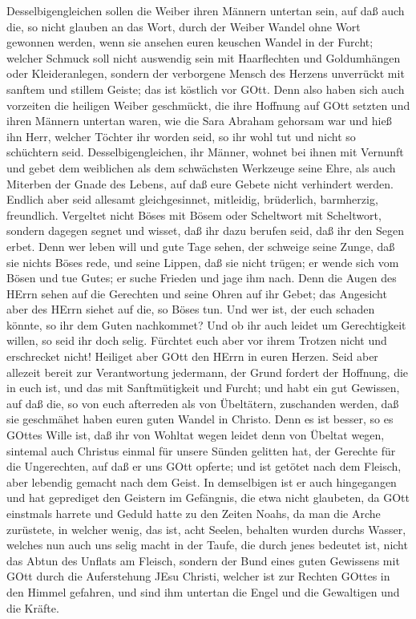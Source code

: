  Desselbigengleichen sollen die Weiber ihren Männern
untertan sein, auf daß auch die, so nicht glauben an das Wort, durch der
Weiber Wandel ohne Wort gewonnen werden,  wenn sie ansehen
euren keuschen Wandel in der Furcht;  welcher Schmuck soll
nicht auswendig sein mit Haarflechten und Goldumhängen oder
Kleideranlegen,  sondern der verborgene Mensch des Herzens
unverrückt mit sanftem und stillem Geiste; das ist köstlich vor GOtt.
 Denn also haben sich auch vorzeiten die heiligen Weiber
geschmückt, die ihre Hoffnung auf GOtt setzten und ihren Männern
untertan waren,  wie die Sara Abraham gehorsam war und hieß
ihn Herr, welcher Töchter ihr worden seid, so ihr wohl tut und nicht so
schüchtern seid.  Desselbigengleichen, ihr Männer, wohnet
bei ihnen mit Vernunft und gebet dem weiblichen als dem schwächsten
Werkzeuge seine Ehre, als auch Miterben der Gnade des Lebens, auf daß
eure Gebete nicht verhindert werden.  Endlich aber seid
allesamt gleichgesinnet, mitleidig, brüderlich, barmherzig, freundlich.
 Vergeltet nicht Böses mit Bösem oder Scheltwort mit
Scheltwort, sondern dagegen segnet und wisset, daß ihr dazu berufen
seid, daß ihr den Segen erbet.  Denn wer leben will und
gute Tage sehen, der schweige seine Zunge, daß sie nichts Böses rede,
und seine Lippen, daß sie nicht trügen;  er wende sich vom
Bösen und tue Gutes; er suche Frieden und jage ihm nach. 
Denn die Augen des HErrn sehen auf die Gerechten und seine Ohren auf ihr
Gebet; das Angesicht aber des HErrn siehet auf die, so Böses tun.
 Und wer ist, der euch schaden könnte, so ihr dem Guten
nachkommet?  Und ob ihr auch leidet um Gerechtigkeit
willen, so seid ihr doch selig. Fürchtet euch aber vor ihrem Trotzen
nicht und erschrecket nicht!  Heiliget aber GOtt den HErrn
in euren Herzen. Seid aber allezeit bereit zur Verantwortung jedermann,
der Grund fordert der Hoffnung, die in euch ist,  und das
mit Sanftmütigkeit und Furcht; und habt ein gut Gewissen, auf daß die,
so von euch afterreden als von Übeltätern, zuschanden werden, daß sie
geschmähet haben euren guten Wandel in Christo.  Denn es
ist besser, so es GOttes Wille ist, daß ihr von Wohltat wegen leidet
denn von Übeltat wegen,  sintemal auch Christus einmal für
unsere Sünden gelitten hat, der Gerechte für die Ungerechten, auf daß er
uns GOtt opferte; und ist getötet nach dem Fleisch, aber lebendig
gemacht nach dem Geist.  In demselbigen ist er auch
hingegangen und hat geprediget den Geistern im Gefängnis, 
die etwa nicht glaubeten, da GOtt einstmals harrete und Geduld hatte zu
den Zeiten Noahs, da man die Arche zurüstete, in welcher wenig, das ist,
acht Seelen, behalten wurden durchs Wasser,  welches nun
auch uns selig macht in der Taufe, die durch jenes bedeutet ist, nicht
das Abtun des Unflats am Fleisch, sondern der Bund eines guten Gewissens
mit GOtt durch die Auferstehung JEsu Christi,  welcher ist
zur Rechten GOttes in den Himmel gefahren, und sind ihm untertan die
Engel und die Gewaltigen und die Kräfte.

